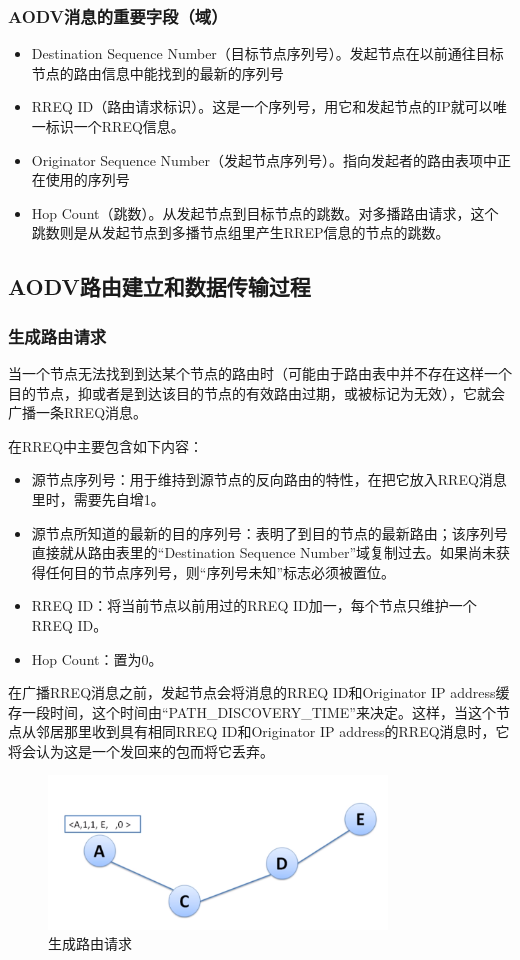 \documentclass[12pt,a4paper]{article}
\begin{document}
\subsubsection{AODV消息的重要字段（域）}
\begin{itemize}
	\item Destination Sequence Number（目标节点序列号）。发起节点在以前通往目标节点的路由信息中能找到的最新的序列号
	\item RREQ ID（路由请求标识）。这是一个序列号，用它和发起节点的IP就可以唯一标识一个RREQ信息。
	\item Originator Sequence Number（发起节点序列号）。指向发起者的路由表项中正在使用的序列号
	\item Hop Count（跳数）。从发起节点到目标节点的跳数。对多播路由请求，这个跳数则是从发起节点到多播节点组里产生RREP信息的节点的跳数。
\end{itemize}

\subsection{AODV路由建立和数据传输过程}
\subsubsection{生成路由请求}
当一个节点无法找到到达某个节点的路由时（可能由于路由表中并不存在这样一个目的节点，抑或者是到达该目的节点的有效路由过期，或被标记为无效），它就会广播一条RREQ消息。

在RREQ中主要包含如下内容：

\begin{itemize}
	\item 源节点序列号：用于维持到源节点的反向路由的特性，在把它放入RREQ消息里时，需要先自增1。
	\item 源节点所知道的最新的目的序列号：表明了到目的节点的最新路由；该序列号直接就从路由表里的“Destination Sequence Number”域复制过去。如果尚未获得任何目的节点序列号，则“序列号未知”标志必须被置位。
	\item RREQ ID：将当前节点以前用过的RREQ ID加一，每个节点只维护一个RREQ ID。
	\item Hop Count：置为0。
\end{itemize}

在广播RREQ消息之前，发起节点会将消息的RREQ ID和Originator IP address缓存一段时间，这个时间由“PATH\_DISCOVERY\_TIME”来决定。这样，当这个节点从邻居那里收到具有相同RREQ ID和Originator IP address的RREQ消息时，它将会认为这是一个发回来的包而将它丢弃。

\begin{figure}[htb]
\centering
\includegraphics[width=9cm]{gen_route_request}
\caption{生成路由请求}
\end{figure}
\end{document}
